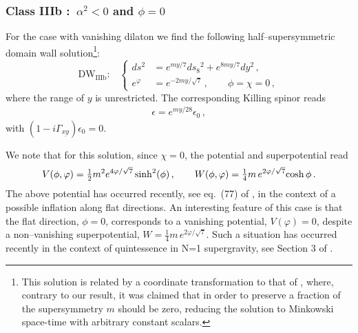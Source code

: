 \documentclass[12pt,a4paper]{article}
\begin{document}
\subsubsection{Class IIIb :\ $\alpha^2 <0$ and $\phi=0$}

For the case with vanishing dilaton we find the following
half--supersymmetric domain wall solution\footnote{This solution
  is related by a coordinate transformation to that of \cite{Cowdall:2000sq},
  where, contrary to our result, it was claimed that in order to preserve a fraction of
  the supersymmetry $m$ should be zero, reducing the solution to Minkowski
space-time
  with arbitrary constant scalars.}:
\begin{equation}
  \text{DW$_{\text{IIIb}}$:~~~}\left\{\begin{aligned}
  ds^2 & = e^{my/7} ds_8{}^2 + e^{8my/7} dy^2 \,, \\
  e^\varphi & = e^{-2my/\sqrt{7}} \,, \qquad \phi = \chi = 0 \,,
\end{aligned}\right.
\label{DWIIIb}
\end{equation}
where the range of $y$ is unrestricted. The corresponding Killing spinor reads
\begin{align}
  \epsilon = e^{my/28} \epsilon_0 \,,
\end{align}
with $(1-i\Gamma_{\underline{xy}})\epsilon_0=0$.

We note that for this solution, since $\chi = 0$, the potential and
superpotential read
\begin{equation}
 V(\phi,\varphi) = \tfrac{1}{2}m^2 e^{4 \varphi / \sqrt{7}}
    \sinh^2(\phi)\, ,\qquad
 W(\phi,\varphi) =\tfrac{1}{4}m\, e^{2\varphi/\sqrt{7}} {\rm cosh}\, \phi\, .
\end{equation}
The above potential has occurred recently, see eq.~(77) of
\cite{Kallosh:2001gr}, in the context of a possible inflation
along flat directions. An interesting feature of this case is that
the flat direction, $\phi=0$, corresponds to a vanishing
potential, $V(\varphi)=0$, despite a non--vanishing superpotential, $W
= \tfrac{1}{4}m \, e^{2\varphi/{\sqrt{7}}}$.
Such a situation has occurred recently in the context of
quintessence in N=1 supergravity, see Section 3 of
\cite{Townsend:2001ea}.
\end{document}
